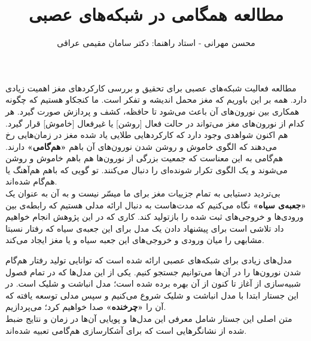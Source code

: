 \documentclass[12pt,onecolumn,a4paper]{article}
\begin{document}
\title{مطالعه همگامی در شبکه‌های عصبی} 
\author{محسن مهرانی - استاد راهنما: دکتر سامان مقیمی عراقی}
\date{}
\maketitle
\tableofcontents
\newpage
{}
مطالعه فعالیت شبکه‌های عصبی برای تحقیق و بررسی کارکردهای مغز اهمیت زیادی دارد. همه بر این باوریم که مغز محمل اندیشه و تفکر است. ما کنجکاو هستیم که چگونه همکاری بین نورون‌های آن باعث می‌شود تا حافظه، کشف و پردازش صورت گیرد. هر کدام از نورون‌های مغز می‌تواند در حالت فعال [روشن] یا غیرفعال [خاموش] قرار گیرد. هم اکنون شواهدی وجود دارد که کارکردهایی طلایی یاد شده مغز در زمان‌هایی رخ می‌دهند که الگوی خاموش و روشن شدن نورون‌های آن باهم \textbf{«هم‌گامی»} دارند. هم‌گامی به این معناست که جمعیت بزرگی از نورون‌ها هم باهم خاموش و روشن می‌شوند و یک الگوی تکرار شونده‌ای را دنبال می‌کنند. تو گویی که باهم هم‌آهنگ یا هم‌گام شده‌اند.\\

بی‌تردید دستیابی به تمام جزییات مغز برای ما میسّر نیست و به آن به عنوان یک \textbf{«جعبه‌ی سیاه»} نگاه می‌کنیم که مدت‌هاست به دنبال ارائه مدلی هستیم که رابطه‌ی بین ورودی‌ها و خروجی‌های ثبت شده را بازتولید کند. کاری که در این پژوهش انجام خواهیم داد تلاشی است برای پیشنهاد دادن یک مدل برای این جعبه‌ی سیاه که رفتار نسبتا مشابهی را میان ورودی و خروجی‌های این جعبه سیاه و یا مغز ایجاد می‌کند.

مدل‌های زیادی برای شبکه‌های عصبی ارائه شده است که توانایی تولید رفتار هم‌گام شدن نورون‌ها را در آن‌ها می‌توانیم جستجو کنیم. یکی از این مدل‌ها که در تمام فصول شبیه‌سازی از آغاز تا کنون از آن بهره برده شده است؛ مدل انباشت و شلیک است\cite{PhysRevLett.105.158104}. در این جستار ابتدا با مدل انباشت و شلیک شروع می‌کنیم و سپس مدلی توسعه یافته که آن را \textbf{«چرخنده»} صدا خواهیم کرد؛ می‌پردازیم.\\
متن اصلی این جستار شامل معرفی این مدل‌ها و پویایی آن‌ها در زمان و نتایج ضبط شده از نشانگرهایی است که برای آشکارسازی هم‌گامی تعبیه شده‌اند.
\end{document}

